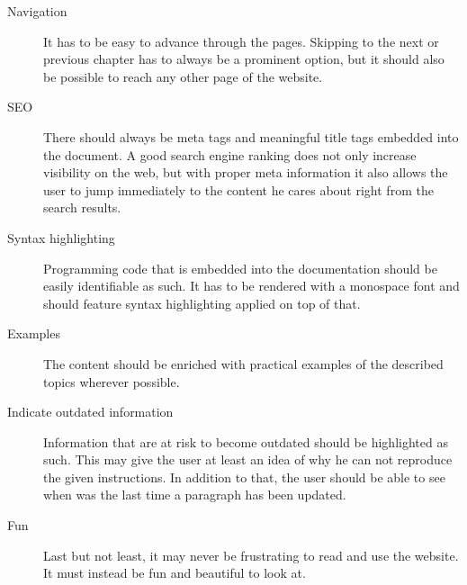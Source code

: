 \begin{description}
	\item[Navigation]\hfill

	It has to be easy to advance through the pages. Skipping to the next or previous chapter has to always be a prominent option, but it should also be possible to reach any other page of the website.

	\item[SEO]\hfill

	There should always be meta tags and meaningful title tags embedded into the document. A good search engine ranking does not only increase visibility on the web, but with proper meta information it also allows the user to jump immediately to the content he cares about right from the search results.

	\item[Syntax highlighting]\hfill

	Programming code that is embedded into the documentation should be easily identifiable as such. It has to be rendered with a monospace font and should feature syntax highlighting applied on top of that.

	\item[Examples]\hfill

	The content should be enriched with practical examples of the described topics wherever possible.

	\item[Indicate outdated information]\hfill

	Information that are at risk to become outdated should be highlighted as such. This may give the user at least an idea of why he can not reproduce the given instructions. In addition to that, the user should be able to see when was the last time a paragraph has been updated.

	\item[Fun]\hfill

	Last but not least, it may never be frustrating to read and use the website. It must instead be fun and beautiful to look at.

\end{description}